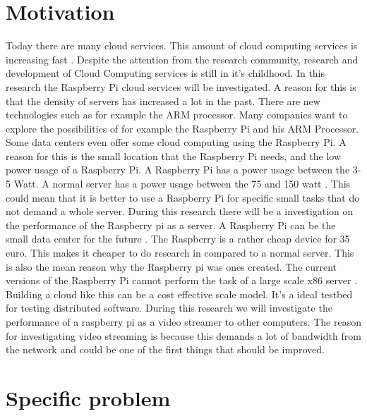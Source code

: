 \documentclass{sig-alternate-br}
\begin{document}

\section{Motivation}
Today there are many cloud services. This amount of cloud computing services is increasing fast \cite{armbrust:2009}.  Despite the attention
from the research community, research and development of
Cloud Computing services is still in it's childhood\cite{tso:2013}. 
In this research the Raspberry Pi cloud services will be investigated. A reason for this is that the density of servers has increased a lot in the past\cite{density}. There are new technologies such as for example the ARM processor. Many companies want to explore the possibilities of for example the Raspberry Pi and his ARM Processor. Some data centers even offer some cloud computing using the Raspberry Pi. A reason for this is the small location that the Raspberry Pi needs, and the low power usage of a Raspberry Pi\cite{hosting,Pcextreme}.  A Raspberry Pi has a power usage between the 3-5 Watt. A normal server has a power usage between the 75 and 150 watt \cite{Powerusage}. This could mean that it is better to use a Raspberry Pi for specific small tasks that do not demand a whole server. During this research there will be a investigation on the performance of the Raspberry pi as a server.  A Raspberry Pi can be the small data center for the future \cite{tso:2013}. The Raspberry is a rather cheap device for 35 euro. This makes it cheaper to do research in compared to a normal server. This is also the mean reason why the Raspberry pi was ones created. The current versions of the Raspberry Pi cannot perform the task of a large scale x86 server \cite{tso:2013}. Building a cloud like this can be a cost effective scale model\cite{tso:2013}. It's a ideal testbed for testing distributed software. During this research we will investigate the performance of a raspberry pi as a video streamer to other computers. The reason for investigating video streaming is because this demands a lot of bandwidth from the network and could be one of the first things that should be improved. 

\section{Specific problem}
\end{document}

